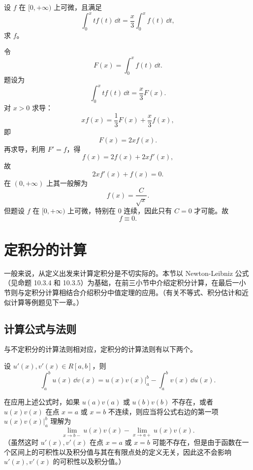 \begin{xexercise}[12]
设 $f$ 在 $[0,+\infty)$ 上可微，且满足
\[
  \int_0^x t f(t)\,\dd t=\frac{x}{3}\int_0^x f(t)\,\dd t,
\]
求 $f$。
\end{xexercise}
\begin{xsolution}
令
\[
  F(x)=\int_0^x f(t)\,\dd t.
\]
题设为
\[
  \int_0^x t f(t)\,\dd t=\frac x3F(x).
\]
对 $x>0$ 求导：
\[
  x f(x)=\frac13F(x)+\frac x3 f(x),
\]
即
\[
  F(x)=2x f(x).
\]
再求导，利用 $F'=f$，得
\[
  f(x)=2f(x)+2x f'(x),
\]
故
\[
  2x f'(x)+f(x)=0.
\]
在 $(0,+\infty)$ 上其一般解为
\[
  f(x)=\frac C{\sqrt x}.
\]
但题设 $f$ 在 $[0,+\infty)$ 上可微，特别在 $0$ 连续，因此只有 $C=0$ 才可能。故
\[
  \boxed{f\equiv0}.
\]
\end{xsolution}


\section{定积分的计算}

一般来说，从定义出发来计算定积分是不切实际的。本节以 Newton-Leibniz 公式（见命题 10.3.4 和 10.3.5）为基础，在前三小节中介绍定积分计算，在最后一小节则与定积分计算相结合介绍积分中值定理的应用。（有关不等式、积分估计和近似计算等例题见下一章。）

\subsection{计算公式与法则}

与不定积分的计算法则相对应，定积分的计算法则有以下两个。

\begin{xtheorem}[10.4.1（定积分的分部积分法）]
设 $u'(x),v'(x)\in R[a,b]$，则
\begin{equation}
  \int_a^b u(x)\,\dd v(x)
  =u(x)v(x)\Big|_a^b-\int_a^b v(x)\,\dd u(x).
  \tag{10.11}
  \label{eq:10.11}
\end{equation}
\end{xtheorem}

\begin{xremark}
在应用上述公式时，如果 $u(a)v(a)$ 或 $u(b)v(b)$ 不存在，或者 $u(x)v(x)$ 在点 $x=a$ 或 $x=b$ 不连续，则应当将公式右边的第一项 $u(x)v(x)|_a^b$ 理解为
\[
  \lim_{x\to b-}u(x)v(x)-\lim_{x\to a+}u(x)v(x).
\]
（虽然这时 $u'(x),v'(x)$ 在点 $x=a$ 或 $x=b$ 可能不存在，但是由于函数在一个区间上的可积性以及积分值与其在有限点处的定义无关，因此这不会影响 $u'(x),v'(x)$ 的可积性以及积分值。）
\end{xremark}

